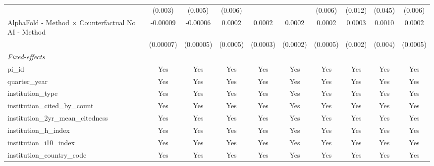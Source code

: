 \begin{tabular}{lccccccccc}
                                                               & (0.003)     & (0.005)       & (0.006)       &          &            & (0.006)       & (0.012)       & (0.045)       & (0.006)\\   
   AlphaFold - Method $\times$ Counterfactual No AI - Method   & -0.00009    & -0.00006      & 0.0002        & 0.0002   & 0.0002     & 0.0002        & 0.0003        & 0.0010        & 0.0002\\   
                                                               & (0.00007)   & (0.00005)     & (0.0005)      & (0.0003) & (0.0002)   & (0.0005)      & (0.002)       & (0.004)       & (0.0005)\\   
   \midrule
   \emph{Fixed-effects}\\
   pi\_id                                                      & Yes         & Yes           & Yes           & Yes      & Yes        & Yes           & Yes           & Yes           & Yes\\  
   quarter\_year                                               & Yes         & Yes           & Yes           & Yes      & Yes        & Yes           & Yes           & Yes           & Yes\\  
   institution\_type                                           & Yes         & Yes           & Yes           & Yes      & Yes        & Yes           & Yes           & Yes           & Yes\\  
   institution\_cited\_by\_count                               & Yes         & Yes           & Yes           & Yes      & Yes        & Yes           & Yes           & Yes           & Yes\\  
   institution\_2yr\_mean\_citedness                           & Yes         & Yes           & Yes           & Yes      & Yes        & Yes           & Yes           & Yes           & Yes\\  
   institution\_h\_index                                       & Yes         & Yes           & Yes           & Yes      & Yes        & Yes           & Yes           & Yes           & Yes\\  
   institution\_i10\_index                                     & Yes         & Yes           & Yes           & Yes      & Yes        & Yes           & Yes           & Yes           & Yes\\  
   institution\_country\_code                                  & Yes         & Yes           & Yes           & Yes      & Yes        & Yes           & Yes           & Yes           & Yes\\  

\end{tabular}
